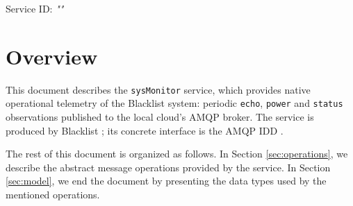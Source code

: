 \documentclass[a4paper]{arrowhead}
\begin{document}
\sloppy

\ArrowheadSetup

\begin{center}
  \vspace*{1cm}
  \huge{\arrowtitle}

  \vspace*{0.2cm}
  \LARGE{\arrowtype}
  \vspace*{1cm}

  \Large{Service ID: \textit{"\arrowid"}}

  \vspace*{\fill}


  \vspace*{1cm}
  \vspace*{\fill}

  \begin{abstract}
    This document describes the native \texttt{sysMonitor} service, version 1.0.0, produced by the Blacklist support system of Arrowhead 5.2.2.
  \end{abstract}

  \vspace*{1cm}
\end{center}

\newpage

\tableofcontents
\newpage

\section{Overview}
\label{sec:overview}

This document describes the \texttt{sysMonitor} service, which provides native operational telemetry of the Blacklist system: periodic \texttt{echo}, \texttt{power} and \texttt{status} observations published to the local cloud's AMQP broker.
The service is produced by Blacklist \cite{bl-sysd}; its concrete interface is the AMQP IDD \cite{bl-sysMonitor-amqp-idd}.

The rest of this document is organized as follows.
In Section \ref{sec:operations}, we describe the abstract message operations provided by the service.
In Section \ref{sec:model}, we end the document by presenting the data types used by the mentioned operations.
\end{document}
